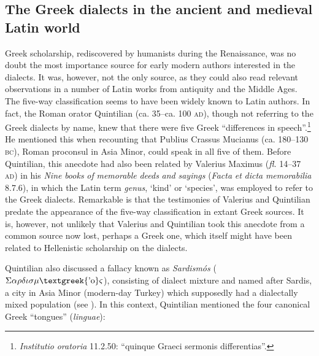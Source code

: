 \documentclass[output=paper]{langsci/langscibook}
\begin{document}
\subsection{The Greek dialects in the ancient and medieval Latin world}
\hypertarget{Toc19704811}{}
Greek scholarship, rediscovered by humanists during the Renaissance, was no doubt the most importance source for early modern authors interested in the dialects. It was, however, not the only source, as they could also read relevant observations in a number of Latin works from antiquity and the Middle Ages. The five-way classification seems to have been widely known to Latin authors. In fact, the Roman orator Quintilian (ca. 35–ca. 100 \textsc{ad}), though not referring to the Greek dialects by name, knew that there were five Greek “differences in speech”.\footnote{ \textrm{\textit{Institutio} \textit{oratoria}} \textrm{11.2.50: “quinque Graeci sermonis differentias”.}} He mentioned this when recounting that Publius Crassus Mucianus (ca. 180–130 \textsc{bc}), Roman proconsul in Asia Minor, could speak in all five of them. Before Quintilian, this anecdote had also been related by Valerius Maximus (\textit{fl.} 14–37 \textsc{ad}) in his \textit{Nine} \textit{books} \textit{of} \textit{memorable} \textit{deeds} \textit{and} \textit{sayings} (\textit{Facta} \textit{et} \textit{dicta} \textit{memorabilia} 8.7.6), in which the Latin term \textit{genus}, ‘kind’ or ‘species’, was employed to refer to the Greek dialects. Remarkable is that the testimonies of Valerius and Quintilian predate the appearance of the five-way classification in extant Greek sources. It is, however, not unlikely that Valerius and Quintilian took this anecdote from a common source now lost, perhaps a Greek one, which itself might have been related to Hellenistic scholarship on the dialects.

Quintilian also discussed a fallacy known as \textit{Sardismós} ($\Sigma \alpha \rho \delta \iota \sigma \mu \text{\textgreek{'o}}\varsigma $), consisting of dialect mixture and named after Sardis, a city in Asia Minor (modern-day Turkey) which supposedly had a dialectally mixed population (see \citealt{Gitner2019}). In this context, Quintilian mentioned the four canonical Greek “tongues” (\textit{linguae}):
\end{document}
